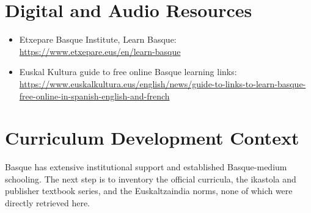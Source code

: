 \documentclass[12pt]{article}
\begin{document}
\section{Digital and Audio Resources}
\begin{itemize}
\item Etxepare Basque Institute, Learn Basque: \url{https://www.etxepare.eus/en/learn-basque}
\item Euskal Kultura guide to free online Basque learning links: \url{https://www.euskalkultura.eus/english/news/guide-to-links-to-learn-basque-free-online-in-spanish-english-and-french}
\end{itemize}

\section{Curriculum Development Context}
Basque has extensive institutional support and established Basque-medium schooling. The next step is to inventory the official curricula, the ikastola and publisher textbook series, and the Euskaltzaindia norms, none of which were directly retrieved here.
\end{document}
